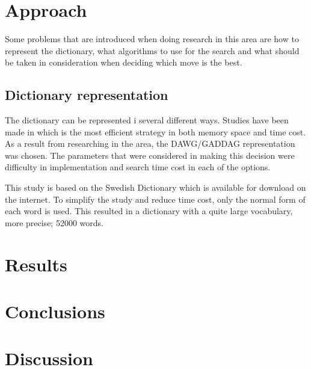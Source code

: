 \documentclass[a4paper, 12pt]{report}
\begin{document}
\chapter{Approach}
Some problems that are introduced when doing research in this area are how to represent the dictionary, what algorithms to use for the search and what should be taken in consideration when deciding which move is the best.
\section{Dictionary representation}
The dictionary can be represented i several different ways. Studies have been made in which is the most efficient strategy in both memory space and time cost. As a result from researching in the area, the DAWG/GADDAG representation was chosen. The parameters that were considered in making this decision were difficulty in implementation and search time cost in each of the options.

This study is based on the Swedish Dictionary which is available for download on the internet. To simplify the study and reduce time cost, only the normal form of each word is used. This resulted in a dictionary with a quite large vocabulary, more precise; 52000 words.
\chapter{Results}
\chapter{Conclusions}
\chapter{Discussion}
\end{document}
